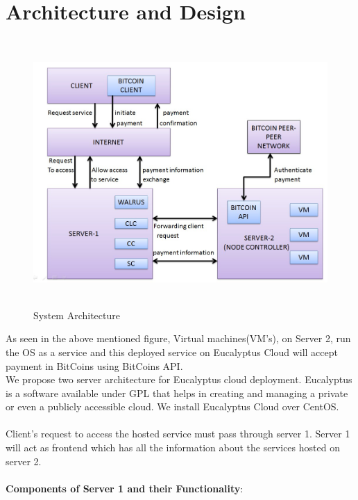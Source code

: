 \documentclass[a4page,12pt]{article}
\begin{document}
\section{Architecture and Design}
\begin{figure}[hbtp]
\caption{System Architecture}
\includegraphics[width=5.5in,height=4.0in]{design.jpg}
\end{figure}
\vspace{0.3 in}
As seen in the above mentioned figure, Virtual machines(VM's), on Server 2, run the OS as a service and this deployed service on Eucalyptus Cloud will accept payment in BitCoins using BitCoins API.\\
We propose two server architecture for Eucalyptus cloud deployment. Eucalyptus is a software available under GPL that helps in creating and managing a private or even a publicly accessible cloud. We install Eucalyptus Cloud over CentOS.\\\\
Client's request to access the hosted service must pass through server 1. Server 1 will act as frontend which has all the information about the services hosted on server 2.\\\\
\textbf{Components of Server 1 and their Functionality}\cite{userguide}: 
\end{document}
